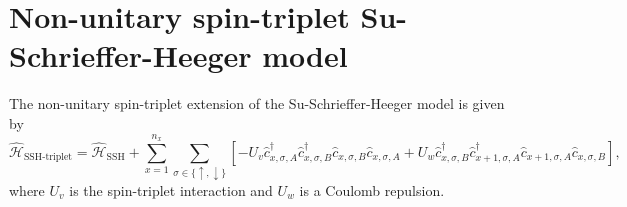 




\section{\label{sec:spin-triplet_SSH} Non-unitary spin-triplet Su-Schrieffer-Heeger model}
The non-unitary spin-triplet extension of the Su-Schrieffer-Heeger model is given by
\begin{equation}
    \hat{\mathcal H}_\text{SSH-triplet} =  
    \hat{\mathcal H}_\text{SSH} +
    \sum_{x=1}^{n_x} \sum_{\sigma\in\{\uparrow,\downarrow\}}
    \left[
    -U_v \hat c_{x, \sigma, A}^\dagger \hat c_{x, \sigma, B}^\dagger \hat c_{x, \sigma, B} \hat c_{x, \sigma, A}
    +U_w \hat c_{x, \sigma, B}^\dagger \hat c_{x+1, \sigma, A}^\dagger \hat c_{x+1, \sigma, A} \hat c_{x, \sigma, B}
\right],
\label{eq:one-dimensional_SSH}
\end{equation}
where $U_v$ is the spin-triplet interaction and $U_w$ is a Coulomb repulsion.

